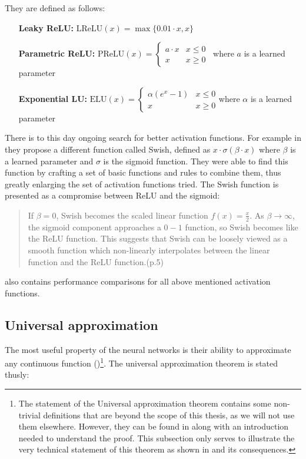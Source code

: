 They are defined as follows:
\begin{itemize}
\item[\textbf{Leaky ReLU:}] $\text{LReLU}(x)=\max\{0.01\cdot x,x\}$
\item[\textbf{Parametric ReLU:}] $\text{PReLU}(x)=
\begin{cases} 
      a\cdot x & x\leq 0 \\
      x & x\geq 0
   \end{cases}$\ where $a$ is a learned parameter
\item[\textbf{Exponential LU:}] $\text{ELU}(x)=
\begin{cases} 
      \alpha(e^x-1) & x\leq 0 \\
      x & x\geq 0
   \end{cases}
$where $\alpha$ is a learned parameter
\end{itemize}

There is to this day ongoing search for better activation functions. For example in  \cite{swish} they propose a different function called Swish, defined as $x\cdot \sigma(\beta\cdot x)$ where $\beta$ is a learned parameter and $\sigma$ is the sigmoid function. They were able to find this function by crafting a set of basic functions and rules to combine them, thus greatly enlarging the set of activation functions tried. The Swish function is presented as a compromise between ReLU and the sigmoid:
\begin{quote}
If $\beta=0$, Swish becomes the scaled linear function $f(x)=\frac{x}{2}$. As $\beta\rightarrow\infty$,  the sigmoid component approaches a $0-1$ function,  so Swish becomes like the ReLU function. This suggests that Swish can be loosely viewed as a smooth function which non-linearly interpolates between the linear function and the ReLU function.(p.5)
\end{quote}

\cite{swish} also contains performance comparisons for all above mentioned activation functions.

\subsection{Universal approximation}

The most useful property of the neural networks is their ability to approximate any continuous function (\cite{universal})\footnote{The statement of the Universal approximation theorem contains some non-trivial definitions that are beyond the scope of this thesis, as we will not use them elsewhere. However, they can be found in \cite{measure} along with an introduction needed to understand the proof. This subsection only serves to illustrate the very technical statement of this theorem as shown in \cite{universal} and its consequences.}. The universal approximation theorem is stated thusly:

